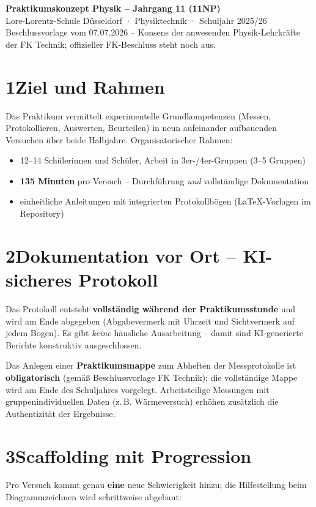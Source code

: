 \documentclass[11pt]{scrartcl}
\begin{document}
\begin{center}
  {\LARGE\bfseries Praktikumskonzept Physik -- Jahrgang 11 (11NP)}\\[2mm]
  {\large Lore-Lorentz-Schule Düsseldorf · Physiktechnik · Schuljahr 2025/26}\\[1mm]
  {\small Beschlussvorlage vom 07.07.2026 -- Konsens der anwesenden Physik-Lehrkräfte der FK Technik; offizieller FK-Beschluss steht noch aus.}
\end{center}

\section*{1\quad Ziel und Rahmen}
Das Praktikum vermittelt experimentelle Grundkompetenzen (Messen, Protokollieren,
Auswerten, Beurteilen) in neun aufeinander aufbauenden Versuchen über beide
Halbjahre. Organisatorischer Rahmen:
\begin{itemize}
  \item 12--14 Schülerinnen und Schüler, Arbeit in 3er-/4er-Gruppen (3--5 Gruppen)
  \item \textbf{135 Minuten} pro Versuch -- Durchführung \emph{und} vollständige Dokumentation
  \item einheitliche Anleitungen mit integrierten Protokollbögen (LaTeX-Vorlagen im Repository)
\end{itemize}

\section*{2\quad Dokumentation vor Ort -- KI-sicheres Protokoll}
\begin{infobox}
Das Protokoll entsteht \textbf{vollständig während der Praktikumsstunde} und wird am
Ende abgegeben (Abgabevermerk mit Uhrzeit und Sichtvermerk auf jedem Bogen).
Es gibt \emph{keine} häusliche Ausarbeitung -- damit sind KI-generierte Berichte
konstruktiv ausgeschlossen.
\end{infobox}
Das Anlegen einer \textbf{Praktikumsmappe} zum Abheften der Messprotokolle ist
\textbf{obligatorisch} (gemäß Beschlussvorlage FK Technik); die vollständige Mappe wird am
Ende des Schuljahres vorgelegt. Arbeitsteilige
Messungen mit gruppenindividuellen Daten (z.\,B. Wärmeversuch) erhöhen
zusätzlich die Authentizität der Ergebnisse.

\section*{3\quad Scaffolding mit Progression}
Pro Versuch kommt genau \textbf{eine} neue Schwierigkeit hinzu; die Hilfestellung
beim Diagrammzeichnen wird schrittweise abgebaut:
\end{document}
